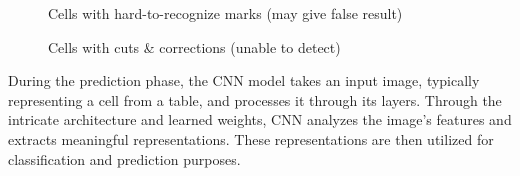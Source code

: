 \begin{figure}[htbp]
    \vspace{\floatsep}
    
    \hfill
    \caption{Cells with hard-to-recognize marks (may give false result)}

    \vspace{\floatsep}

    \hfill
    \caption{Cells with cuts \& corrections (unable to detect)}

\end{figure}

\noindent During the prediction phase, the CNN model takes an input image, typically representing a cell from a table, and processes it through its layers. Through the intricate architecture and learned weights, CNN analyzes the image's features and extracts meaningful representations. These representations are then utilized for classification and prediction purposes.

